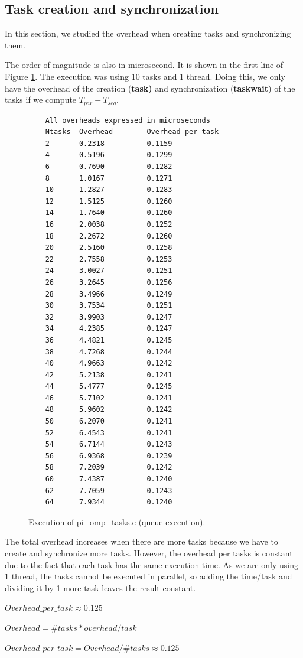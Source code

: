 \documentclass[12pt, a4paper]{article}
\begin{document}
\subsection{Task creation and synchronization}

In this section, we studied the overhead when creating tasks and synchronizing them.

The order of magnitude is also in microsecond. It is shown in the first line of Figure \ref{piomptasks}. The execution was using 10 tasks and 1 thread. Doing this, we only have the overhead of the creation (\textbf{task)} and synchronization (\textbf{taskwait}) of the tasks if we compute $T_{par} - T_{seq}$.

\begin{figure}[H]
\begin{lstlisting}
	All overheads expressed in microseconds
	Ntasks  Overhead        Overhead per task
	2       0.2318          0.1159
	4       0.5196          0.1299
	6       0.7690          0.1282
	8       1.0167          0.1271
	10      1.2827          0.1283
	12      1.5125          0.1260
	14      1.7640          0.1260
	16      2.0038          0.1252
	18      2.2672          0.1260
	20      2.5160          0.1258
	22      2.7558          0.1253
	24      3.0027          0.1251
	26      3.2645          0.1256
	28      3.4966          0.1249
	30      3.7534          0.1251
	32      3.9903          0.1247
	34      4.2385          0.1247
	36      4.4821          0.1245
	38      4.7268          0.1244
	40      4.9663          0.1242
	42      5.2138          0.1241
	44      5.4777          0.1245
	46      5.7102          0.1241
	48      5.9602          0.1242
	50      6.2070          0.1241
	52      6.4543          0.1241
	54      6.7144          0.1243
	56      6.9368          0.1239
	58      7.2039          0.1242
	60      7.4387          0.1240
	62      7.7059          0.1243
	64      7.9344          0.1240
	\end{lstlisting}
	\caption{Execution of pi\_omp\_tasks.c (queue execution).}
	\label{piomptasks}
\end{figure}

The total overhead increases when there are more tasks because we have to create and synchronize more tasks. However, the overhead per tasks is constant due to the fact that each task has the same execution time. As we are only using 1 thread, the tasks cannot be executed in parallel, so adding the time/task and dividing it by 1 more task leaves the result constant.

$ Overhead\_per\_task \approx 0.125 $

$ Overhead = \#tasks * overhead/task $

$ Overhead\_per\_task = Overhead/\#tasks \approx 0.125 $
\end{document}
